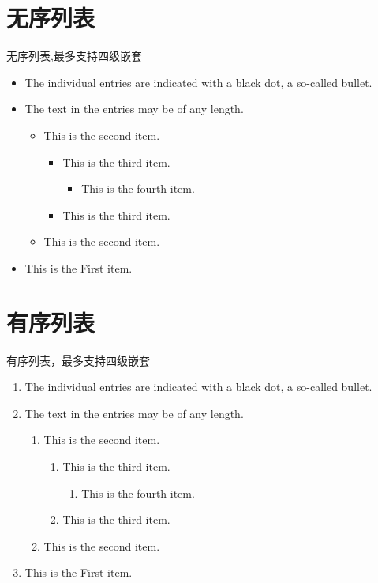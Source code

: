 \documentclass[a4paper, 12pt]{book}
\begin{document}
\tableofcontents
\newpage

\section{无序列表}
无序列表,最多支持四级嵌套
\begin{itemize}
    \item The individual entries are indicated with a black dot, a so-called bullet.
    \item The text in the entries may be of any length.
        \begin{itemize}
            \item This is the second item.
                \begin{itemize}
                    \item This is the third item.
                        \begin{itemize}
                            \item This is the fourth item.
                        \end{itemize}
                    \item This is the third item.
                \end{itemize}
            \item This is the second item.
        \end{itemize}
    \item This is the First item.
\end{itemize}

\section{有序列表}
有序列表，最多支持四级嵌套
\begin{enumerate}
    \item The individual entries are indicated with a black dot, a so-called bullet.
    \item The text in the entries may be of any length.
        \begin{enumerate}
            \item This is the second item.
                \begin{enumerate}
                    \item This is the third item.
                        \begin{enumerate}
                            \item This is the fourth item.
                        \end{enumerate}
                    \item This is the third item.
                \end{enumerate}
            \item This is the second item.
        \end{enumerate}
    \item This is the First item.
\end{enumerate}
\end{document}
